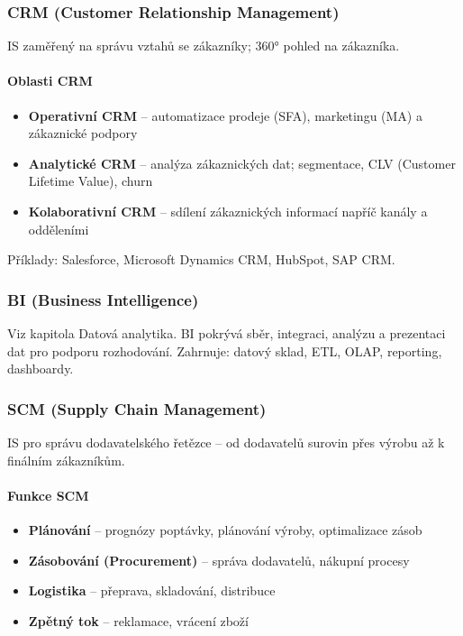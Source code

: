 \subsubsection{CRM (Customer Relationship Management)}

IS zaměřený na správu vztahů se zákazníky; 360° pohled na zákazníka.

\paragraph{Oblasti CRM}
\begin{itemize}
  \item \textbf{Operativní CRM} -- automatizace prodeje (SFA), marketingu (MA) a zákaznické podpory
  \item \textbf{Analytické CRM} -- analýza zákaznických dat; segmentace, CLV (Customer Lifetime Value), churn
  \item \textbf{Kolaborativní CRM} -- sdílení zákaznických informací napříč kanály a odděleními
\end{itemize}

Příklady: Salesforce, Microsoft Dynamics CRM, HubSpot, SAP CRM.

\subsubsection{BI (Business Intelligence)}

Viz kapitola Datová analytika. BI pokrývá sběr, integraci, analýzu a prezentaci dat pro podporu
rozhodování. Zahrnuje: datový sklad, ETL, OLAP, reporting, dashboardy.

\subsubsection{SCM (Supply Chain Management)}

IS pro správu dodavatelského řetězce -- od dodavatelů surovin přes výrobu až k finálním zákazníkům.

\paragraph{Funkce SCM}
\begin{itemize}
  \item \textbf{Plánování} -- prognózy poptávky, plánování výroby, optimalizace zásob
  \item \textbf{Zásobování (Procurement)} -- správa dodavatelů, nákupní procesy
  \item \textbf{Logistika} -- přeprava, skladování, distribuce
  \item \textbf{Zpětný tok} -- reklamace, vrácení zboží
\end{itemize}

